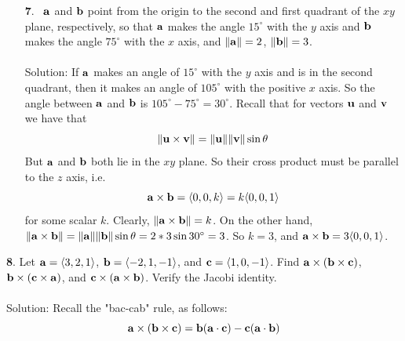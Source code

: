 \documentclass[12pt]{amsbook}
\newcommand{\la}{\langle}
\newcommand{\ra}{\rangle}
\begin{document}
\begin{enumerate}
\\
{\sc Solution}: From the given information, we can write $\bf a$ in polar form as 
${\bf a}=3\la \cos\pi/3,\sin\pi/3,0\ra =\frac 32\la 1,\sqrt{3},0\ra$
and we can write $\bf b$ as ${\bf b}=2\la 0,0,1\ra$. So,
$${\bf a}\times{\bf b}=\frac 32*2\det\begin{pmatrix} \hat{\bf e}_1 & \hat{\bf e}_2 & \hat{\bf e}_3\cr 1&\sqrt{3}&0\cr 0&0&1 \cr \end{pmatrix}= 3\la \det\begin{pmatrix}
\sqrt{3}&0\cr 0&1\cr \end{pmatrix},-\det\begin{pmatrix} 1&0\cr 0&1\cr \end{pmatrix},\det\begin{pmatrix} 1&\sqrt{3}\cr 0&0\cr  \end{pmatrix}\ra =3\la \sqrt{3},-1,0 \ra $$
\item[{\small\bf 7}.]\ ${\bf a}$ and ${\bf b}$ point from the origin
to the second and first quadrant of the $xy$ plane, respectively, so that
${\bf a}$ makes the angle $15^\circ$ with the $y$ axis and ${\bf b}$ makes 
the angle $75^\circ$ with the $x$ axis, and $\|{\bf a}\|=2$, $\|{\bf b}\|=3$.
\\
\\
{\sc Solution}:
If $\bf a$ makes an angle of $15^\circ$ with the $y$ axis and is in the second quadrant, then it makes an angle of $105^\circ$ with the positive $x$ axis. So the angle between $\bf a$ and $\bf b$ is $105^\circ-75^\circ=30^\circ$. Recall that for vectors $\bf u$ and $\bf v$ we have that 
$$\|{\bf u}\times{\bf v}\|=\|{\bf u}\|\|{\bf v}\|\sin\theta$$
But $\bf a$ and $\bf b$ both lie in the $xy$ plane. So their cross product must be parallel to the $z$ axis, i.e.
$${\bf a}\times{\bf b}=\la 0,0,k\ra = k\la 0,0,1\ra$$
for some scalar $k$. Clearly, $\|{\bf a}\times{\bf b}\|=k$. On the other hand, $\|{\bf a}\times{\bf b}\|=\|{\bf a}\|\|{\bf b}\|\sin\theta=2*3\sin30^\circ=3$. So $k=3$, and ${\bf a}\times{\bf b}=3\la 0,0,1\ra$.
\\
\end{enumerate}
{\small\bf 8}. Let ${\bf a}=\la 3,2,1\ra$, ${\bf b}=
\la -2,1,-1\ra$, and ${\bf c}=\la 1,0,-1\ra$.
Find ${\bf a}\times({\bf b}\times{\bf c})$, 
${\bf b}\times({\bf c}\times{\bf a})$, and 
${\bf c}\times({\bf a}\times{\bf b})$. Verify the Jacobi identity.
\\
\\
{\sc Solution}: Recall the "bac-cab" rule, as follows:
$${\bf a}\times({\bf b}\times{\bf c})={\bf b}({\bf a}\cdot{\bf c})-{\bf c}({\bf a}\cdot{\bf b})$$
\end{document}
